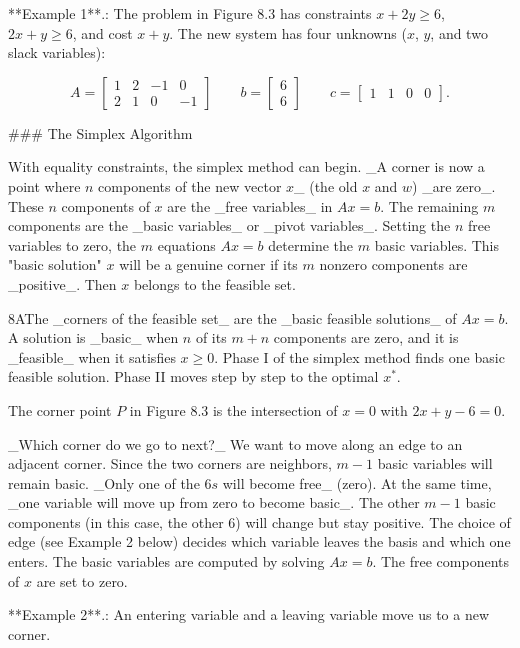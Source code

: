 

**Example 1**.: The problem in Figure 8.3 has constraints \(x+2y\geq 6\), \(2x+y\geq 6\), and cost \(x+y\). The new system has four unknowns (\(x\), \(y\), and two slack variables):

\[A=\begin{bmatrix}1&2&-1&0\\ 2&1&0&-1\end{bmatrix}\qquad b=\begin{bmatrix}6\\ 6\end{bmatrix}\qquad c=\begin{bmatrix}1&1&0&0\end{bmatrix}.\]

### The Simplex Algorithm

With equality constraints, the simplex method can begin. _A corner is now a point where \(n\) components of the new vector \(x\)_ (the old \(x\) and \(w\)) _are zero_. These \(n\) components of \(x\) are the _free variables_ in \(Ax=b\). The remaining \(m\) components are the _basic variables_ or _pivot variables_. Setting the \(n\) free variables to zero, the \(m\) equations \(Ax=b\) determine the \(m\) basic variables. This "basic solution" \(x\) will be a genuine corner if its \(m\) nonzero components are _positive_. Then \(x\) belongs to the feasible set.

8AThe _corners of the feasible set_ are the _basic feasible solutions_ of \(Ax=b\). A solution is _basic_ when \(n\) of its \(m+n\) components are zero, and it is _feasible_ when it satisfies \(x\geq 0\). Phase I of the simplex method finds one basic feasible solution. Phase II moves step by step to the optimal \(x^{*}\).

The corner point \(P\) in Figure 8.3 is the intersection of \(x=0\) with \(2x+y-6=0\).

_Which corner do we go to next?_ We want to move along an edge to an adjacent corner. Since the two corners are neighbors, \(m-1\) basic variables will remain basic. _Only one of the \(6s\) will become free_ (zero). At the same time, _one variable will move up from zero to become basic_. The other \(m-1\) basic components (in this case, the other \(6\)) will change but stay positive. The choice of edge (see Example 2 below) decides which variable leaves the basis and which one enters. The basic variables are computed by solving \(Ax=b\). The free components of \(x\) are set to zero.

**Example 2**.: An entering variable and a leaving variable move us to a new corner.

